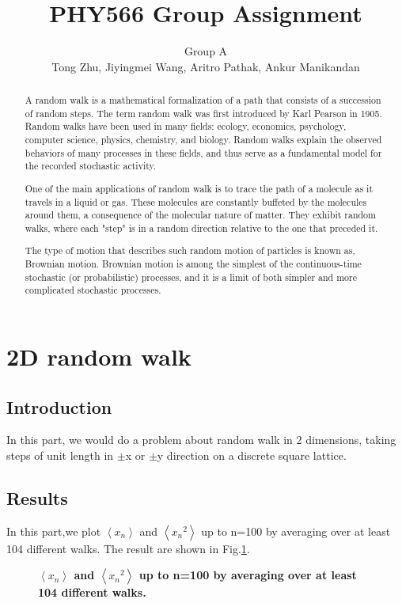 \documentclass[11pt, oneside]{article}   	%
\title{{\bf PHY566 Group Assignment }}
\author{Group A\\ Tong Zhu, Jiyingmei Wang, Aritro Pathak, Ankur Manikandan}
\begin{document}
\maketitle


\begin{abstract}
A random walk is a mathematical formalization of a path that consists of a succession of random steps. The term random walk was first introduced by Karl Pearson in 1905.  Random walks have been used in many fields: ecology, economics, psychology, computer science, physics, chemistry, and biology.  Random walks explain the observed behaviors of many processes in these fields, and thus serve as a fundamental model for the recorded stochastic activity. 

One of the main applications of random walk is to trace the path of a molecule as it travels in a liquid or gas. These molecules are constantly buffeted by the molecules around them, a consequence of the molecular nature of matter. They exhibit random walks, where each "step" is in a random direction relative to the one that preceded it.

The type of motion that describes such random motion of particles is known as, Brownian motion. Brownian motion is among the simplest of the continuous-time stochastic (or probabilistic) processes, and it is a limit of both simpler and more complicated stochastic processes. 
\end{abstract}


\section{2D random walk}
\subsection{Introduction}
In this part, we would do a problem about random walk in 2 dimensions, taking steps of unit length in $\pm$x or $\pm$y direction on a discrete square lattice.
\subsection{Results}
In this part,we plot $\left \langle x_n \right\rangle$ and $\left \langle {x_n}^2 \right\rangle$ up to n=100 by averaging over at least 104 different walks. The result are shown in Fig.\ref{figrw1}.

\begin{figure}[h]
\begin{center}
\caption{{\bf $\left \langle x_n \right\rangle$ and $\left \langle {x_n}^2 \right\rangle$ up to n=100 by averaging over at least 104 different walks. }}
\label{figrw1}
\end{center}
\end{figure}
\end{document}
